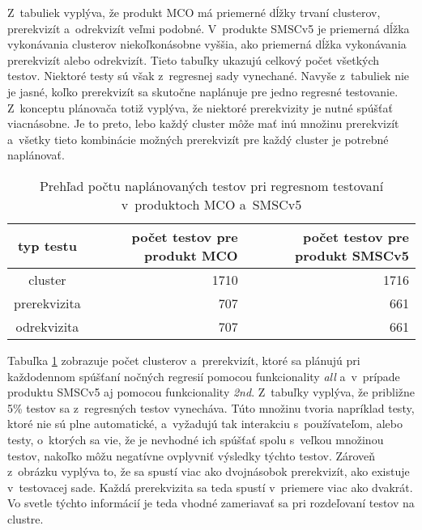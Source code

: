 Z~tabuliek vyplýva, že produkt MCO má priemerné dĺžky trvaní clusterov, 
prerekvizít a~odrekvizít veľmi podobné. V~produkte SMSCv5 je priemerná
dĺžka vykonávania clusterov niekoľkonásobne vyššia, ako priemerná dĺžka 
vykonávania prerekvizít alebo odrekvizít.
Tieto tabuľky ukazujú celkový počet všetkých testov. 
Niektoré testy sú však z~regresnej sady vynechané.
Navyše z~tabuliek nie je jasné, koľko prerekvizít sa skutočne naplánuje 
pre jedno regresné testovanie. Z~konceptu plánovača totiž vyplýva, že niektoré 
prerekvizity je nutné spúšťať viacnásobne.
Je to preto, lebo každý cluster môže mať inú množinu prerekvizít
a~všetky tieto kombinácie možných prerekvizít pre každý cluster
je potrebné naplánovať.

\begin{table}
  \begin{center}
    \begin{tabular}{| c | r | r |}
    \hline
    typ testu    & počet testov pre produkt MCO & 
    počet testov pre produkt SMSCv5 \\ \hline
    cluster      & 1710 & 1716 \\ \hline
    prerekvizita & 707  & 661  \\ \hline
    odrekvizita  & 707  & 661 \\
    \hline
    \end{tabular}
    \caption{Prehľad počtu naplánovaných testov pri regresnom testovaní 
             v~produktoch MCO a~SMSCv5}
    \label{tabulka:pocet_naplanovanych_testov}
  \end{center}
\end{table}

Tabuľka \ref{tabulka:pocet_naplanovanych_testov} zobrazuje počet 
clusterov a~prerekvizít, ktoré sa plánujú pri každodennom spúšťaní 
nočných regresií pomocou funkcionality \textit{all} a~v~prípade produktu 
SMSCv5 aj pomocou funkcionality \textit{2nd}. Z~tabuľky vyplýva, že 
približne 5\% testov sa z~regresných testov vynecháva. 
Túto množinu tvoria napríklad testy, ktoré nie sú plne automatické, 
a~vyžadujú tak interakciu s~používateľom, alebo testy, o~ktorých sa vie, 
že je nevhodné ich spúšťať spolu s~veľkou množinou testov, 
nakoľko môžu negatívne ovplyvniť výsledky týchto testov.
Zároveň z~obrázku vyplýva to, že sa spustí viac ako dvojnásobok 
prerekvizít, ako existuje v~testovacej sade. Každá prerekvizita sa teda 
spustí v~priemere viac ako dvakrát. Vo svetle týchto informácií je teda 
vhodné zameriavať sa pri rozdeľovaní testov na clustre.

